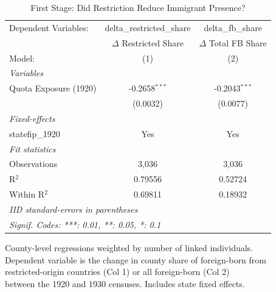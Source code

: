 
\begin{table}[htbp]
   \caption{\label{tab:firststage} First Stage: Did Restriction Reduce Immigrant Presence?}
   \centering
   \begin{tabular}{lcc}
      \tabularnewline \midrule \midrule
      Dependent Variables:  & delta\_restricted\_share   & delta\_fb\_share\\    
                            & $\Delta$ Restricted Share  & $\Delta$ Total FB Share \\    
      Model:                & (1)                        & (2)\\  
      \midrule
      \emph{Variables}\\
      Quota Exposure (1920) & -0.2658$^{***}$            & -0.2043$^{***}$\\   
                            & (0.0032)                   & (0.0077)\\   
      \midrule
      \emph{Fixed-effects}\\
      statefip\_1920        & Yes                        & Yes\\  
      \midrule
      \emph{Fit statistics}\\
      Observations          & 3,036                      & 3,036\\  
      R$^2$                 & 0.79556                    & 0.52724\\  
      Within R$^2$          & 0.69811                    & 0.18932\\  
      \midrule \midrule
      \multicolumn{3}{l}{\emph{IID standard-errors in parentheses}}\\
      \multicolumn{3}{l}{\emph{Signif. Codes: ***: 0.01, **: 0.05, *: 0.1}}\\
   \end{tabular}
   
   \par \raggedright 
   County-level regressions weighted by number of linked individuals.\\
   Dependent variable is the change in county share of foreign-born from\\
   restricted-origin countries (Col 1) or all foreign-born (Col 2)\\
   between the 1920 and 1930 censuses. Includes state fixed effects.
\end{table}


